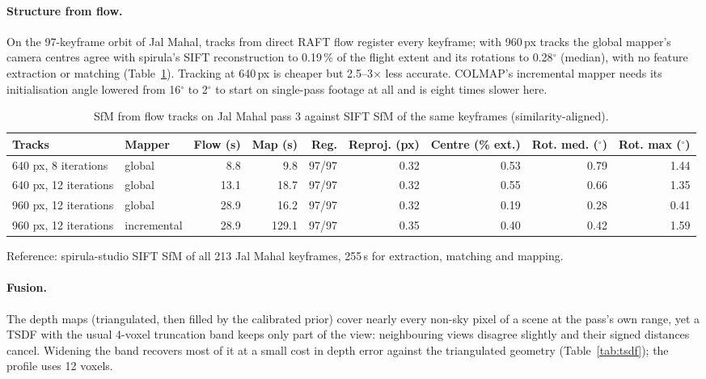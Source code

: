 \paragraph{Structure from flow.} On the 97-keyframe orbit of Jal Mahal, tracks from direct RAFT flow register every keyframe; with 960\,px tracks the global mapper's camera centres agree with spirula's SIFT reconstruction to 0.19\,\% of the flight extent and its rotations to 0.28$^\circ$ (median), with no feature extraction or matching (Table~\ref{tab:flowsfm}). Tracking at 640\,px is cheaper but 2.5--3$\times$ less accurate. COLMAP's incremental mapper needs its initialisation angle lowered from 16$^\circ$ to 2$^\circ$ to start on single-pass footage at all and is eight times slower here.

\begin{table}[htbp]
\centering\small
\caption{SfM from flow tracks on Jal Mahal pass 3 against SIFT SfM of the same keyframes (similarity-aligned).}\label{tab:flowsfm}
\begin{adjustbox}{max width=\linewidth}
\begin{tabular}{llrrrrrrr}
\toprule
Tracks & Mapper & Flow (s) & Map (s) & Reg. & Reproj. (px) & Centre (\% ext.) & Rot. med. ($^\circ$) & Rot. max ($^\circ$) \\
\midrule
640 px, 8 iterations & global & 8.8 & 9.8 & 97/97 & 0.32 & 0.53 & 0.79 & 1.44 \\
640 px, 12 iterations & global & 13.1 & 18.7 & 97/97 & 0.32 & 0.55 & 0.66 & 1.35 \\
960 px, 12 iterations & global & 28.9 & 16.2 & 97/97 & 0.32 & 0.19 & 0.28 & 0.41 \\
960 px, 12 iterations & incremental & 28.9 & 129.1 & 97/97 & 0.35 & 0.40 & 0.42 & 1.59 \\
\bottomrule
\end{tabular}
\end{adjustbox}
\par\smallskip\footnotesize Reference: spirula-studio SIFT SfM of all 213 Jal Mahal keyframes, 255\,s for extraction, matching and mapping.
\end{table}

\paragraph{Fusion.} The depth maps (triangulated, then filled by the calibrated prior) cover nearly every non-sky pixel of a scene at the pass's own range, yet a TSDF with the usual 4-voxel truncation band keeps only part of the view: neighbouring views disagree slightly and their signed distances cancel. Widening the band recovers most of it at a small cost in depth error against the triangulated geometry (Table~\ref{tab:tsdf}); the profile uses 12 voxels.


